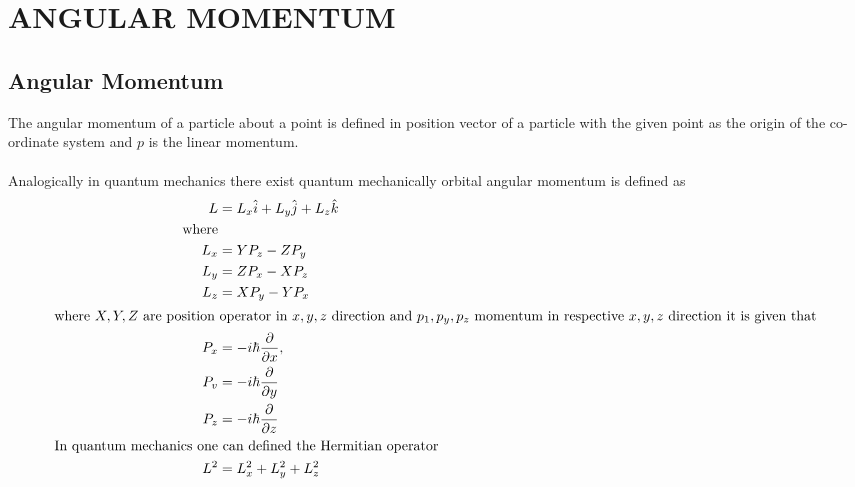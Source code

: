 \chapter{ANGULAR MOMENTUM}
\section{Angular Momentum }
The angular momentum of a particle about a point is defined in position vector of a particle with the given point as the origin of the co-ordinate system and $p$ is the linear momentum.\\\\
Analogically in quantum mechanics there exist quantum mechanically orbital angular momentum is defined as
\begin{align*}
L&=L_{x} \hat{i}+L_{y} \hat{j}+L_{z} \hat{k}\\
\text{where}&\\
L_{x}&=Y P_{z}-Z P_{y}\\
L_{y}&=Z P_{x}-X P_{z}\\
L_{z}&=X P_{y}-Y P_{x}\\
\intertext{where $X, Y, Z$ are position operator in $x, y, z$ direction and $p_{1}, p_{y}, p_{z}$ momentum in respective
	$x, y, z$ direction it is given that }
P_{x}&=-i \hbar \frac{\partial}{\partial x},\\
 P_{v}&=-i \hbar \frac{\partial}{\partial y}\\
P_{z}&=-i \hbar \frac{\partial}{\partial z}\\
\text{In quantum mechanics one}&\text{ can defined the Hermitian operator}\\
L^{2}&=L_{x}^{2}+L_{y}^{2}+L_{z}^{2}
\end{align*}
